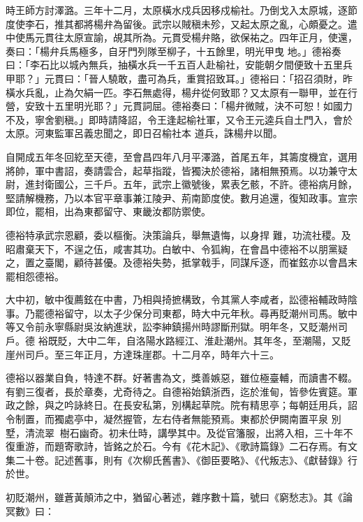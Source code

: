 \begin{pinyinscope}
 時王師方討澤潞。三年十二月，太原橫水戍兵因移戍榆社。乃倒戈入太原城，逐節度使李石，推其都將楊弁為留後。武宗以賊稹未殄，又起太原之亂，心頗憂之。遣中使馬元貫往太原宣諭，覘其所為。元貫受楊弁賂，欲保祐之。四年正月，使還，奏曰：「楊弁兵馬極多，自牙門列隊至柳子，十五餘里，明光甲曳
 地。」德裕奏曰：「李石比以城內無兵，抽橫水兵一千五百人赴榆社，安能朝夕間便致十五里兵甲耶？」元貫曰：「晉人驍敢，盡可為兵，重賞招致耳。」德裕曰：「招召須財，昨橫水兵亂，止為欠絹一匹。李石無處得，楊弁從何致耶？又太原有一聯甲，並在行營，安致十五里明光耶？」元貫詞屈。德裕奏曰：「楊弁微賊，決不可恕！如國力不及，寧舍劉稹。」即時請降詔，令王逢起榆社軍，又令王元逵兵自土門入，會於太原。河東監軍呂義忠聞之，即日召榆社本
 道兵，誅楊弁以聞。



 自開成五年冬回紇至天德，至會昌四年八月平澤潞，首尾五年，其籌度機宜，選用將帥，軍中書詔，奏請雲合，起草指蹤，皆獨決於德裕，諸相無預焉。以功兼守太尉，進封衛國公，三千戶。五年，武宗上徽號後，累表乞骸，不許。德裕病月餘，堅請解機務，乃以本官平章事兼江陵尹、荊南節度使。數月追還，復知政事。宣宗即位，罷相，出為東都留守、東畿汝都防禦使。



 德裕特承武宗恩顧，委以樞衡。決策論兵，舉無遺悔，以身捍
 難，功流社稷。及昭肅棄天下，不逞之伍，咸害其功。白敏中、令狐綯，在會昌中德裕不以朋黨疑之，置之臺閣，顧待甚優。及德裕失勢，抵掌戟手，同謀斥逐，而崔鉉亦以會昌末罷相怨德裕。



 大中初，敏中復薦鉉在中書，乃相與掎摭構致，令其黨人李咸者，訟德裕輔政時陰事。乃罷德裕留守，以太子少保分司東都，時大中元年秋。尋再貶潮州司馬。敏中等又令前永寧縣尉吳汝納進狀，訟李紳鎮揚州時謬斷刑獄。明年冬，又貶潮州司戶。德
 裕既貶，大中二年，自洛陽水路經江、淮赴潮州。其年冬，至潮陽，又貶崖州司戶。至三年正月，方達珠崖郡。十二月卒，時年六十三。



 德裕以器業自負，特達不群。好著書為文，獎善嫉惡，雖位極臺輔，而讀書不輟。有劉三復者，長於章奏，尤奇待之。自德裕始鎮浙西，迄於淮甸，皆參佐賓筵。軍政之餘，與之吟詠終日。在長安私第，別構起草院。院有精思亭；每朝廷用兵，詔令制置，而獨處亭中，凝然握管，左右侍者無能預焉。東都於伊闕南置平泉
 別墅，清流翠，樹石幽奇。初未仕時，講學其中。及從官籓服，出將入相，三十年不復重游，而題寄歌詩，皆銘之於石。今有《花木記》、《歌詩篇錄》二石存焉。有文集二十卷。記述舊事，則有《次柳氏舊書》、《御臣要略》、《代叛志》、《獻替錄》行於世。



 初貶潮州，雖蒼黃顛沛之中，猶留心著述，雜序數十篇，號曰《窮愁志》。其《論冥數》曰：




\end{pinyinscope}
